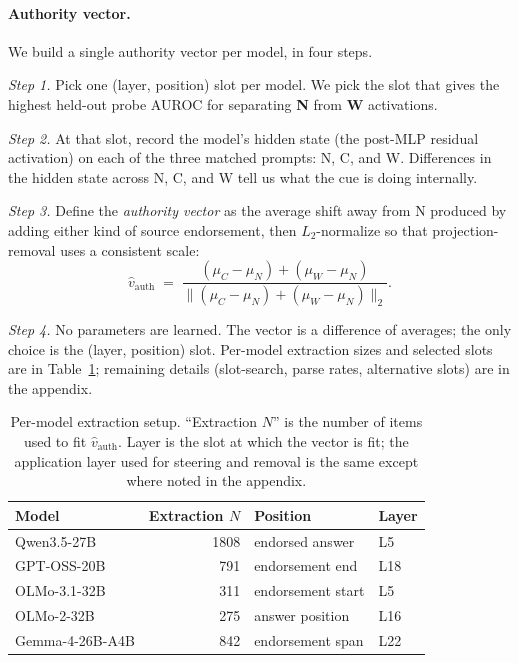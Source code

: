 \documentclass{article}
\begin{document}
\paragraph{Authority vector.}
We build a single authority vector per model, in four steps.

\emph{Step 1.} Pick one (layer, position) slot per model. We pick the slot that gives the highest held-out probe AUROC for separating \textbf{N} from \textbf{W} activations.

\emph{Step 2.} At that slot, record the model's hidden state (the post-MLP residual activation) on each of the three matched prompts: N, C, and W. Differences in the hidden state across N, C, and W tell us what the cue is doing internally.

\emph{Step 3.} Define the \emph{authority vector} as the average shift away from N produced by adding either kind of source endorsement, then $L_2$-normalize so that projection-removal uses a consistent scale:
\begin{equation}
\hat{v}_{\mathrm{auth}}
\;=\;
\frac{(\mu_C - \mu_N) + (\mu_W - \mu_N)}{\lVert (\mu_C - \mu_N) + (\mu_W - \mu_N) \rVert_2}.
\label{eq:vauthority}
\end{equation}

\emph{Step 4.} No parameters are learned. The vector is a difference of averages; the only choice is the (layer, position) slot. Per-model extraction sizes and selected slots are in Table~\ref{tab:extraction}; remaining details (slot-search, parse rates, alternative slots) are in the appendix.

\begin{table}[t]
\centering
\caption{Per-model extraction setup. ``Extraction $N$'' is the number of items used to fit $\hat{v}_{\mathrm{auth}}$. Layer is the slot at which the vector is fit; the application layer used for steering and removal is the same except where noted in the appendix.}
\label{tab:extraction}
\small
\begin{tabular}{lrll}
\toprule
Model & Extraction $N$ & Position & Layer \\
\midrule
Qwen3.5-27B          & 1808 & endorsed answer    & L5 \\
GPT-OSS-20B          &  791 & endorsement end    & L18 \\
OLMo-3.1-32B         &  311 & endorsement start  & L5 \\
OLMo-2-32B           &  275 & answer position    & L16 \\
Gemma-4-26B-A4B      &  842 & endorsement span   & L22 \\
\bottomrule
\end{tabular}
\end{table}
\end{document}

